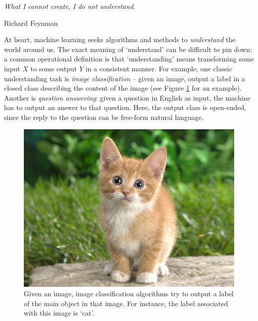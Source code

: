 
\epigraph{\textit{What I cannot create, I do not understand.}}{Richard Feynman}

At heart, machine learning seeks algorithms and methods to \textit{understand} the world around us. The exact meaning of `understand' can be difficult to pin down: a common operational definition is that `understanding' means transforming some input $X$ to some output $Y$ in a consistent manner. For example, one classic understanding task is \textit{image classification} -- given an image, output a label in a closed class describing the content of the image (see Figure \ref{fig:chap_1_cat} for an example). Another is \textit{question answering}: given a question in English as input, the machine has to output an answer to that question. Here, the output class is open-ended, since the reply to the question can be free-form natural language.

\begin{figure}
\centering
    \includegraphics{Chapter1/figs/cat.jpg}
    \caption{Given an image, image classification algorithms try to output a label of the main object in that image. For instance, the label associated with this image is `cat'.}
    \label{fig:chap_1_cat}
    \vspace{-1em}
\end{figure}

